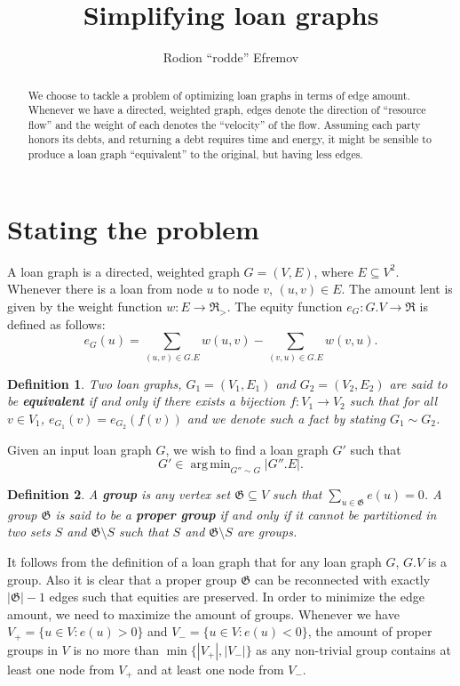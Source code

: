 \documentclass[10pt]{article}
\title{Simplifying loan graphs}
\author{Rodion ``rodde'' Efremov}
\newtheorem{mydef}{Definition}
\DeclareMathOperator*{\argmin}{arg\,min}
\begin{document}
\maketitle

\begin{abstract}
We choose to tackle a problem of optimizing loan graphs in terms of edge amount. Whenever we have a directed, weighted graph, edges denote the direction of ``resource flow'' and the weight of each denotes the ``velocity'' of the flow. Assuming each party honors its debts, and returning a debt requires time and energy, it might be sensible to produce a loan graph ``equivalent'' to the original, but having less edges.
\end{abstract}

\section{Stating the problem} A loan graph is a directed, weighted graph $G = (V, E)$, where $E \subseteq V^2$. Whenever there is a loan from node $u$ to node $v$, $(u, v) \in E$. The amount lent is given by the weight function $w \colon E \to \mathfrak{R}_{>}$. The equity function $e_G \colon G.V \to \mathfrak{R}$ is defined as follows:
\[
e_G(u) = \sum_{(u, v) \in G.E} w(u, v) - \sum_{(v, u) \in G.E} w(v, u).
\]
\begin{mydef}
Two loan graphs, $G_1 = (V_1, E_1)$ and $G_2 = (V_2, E_2)$ are said to be \textbf{equivalent} if and only if there exists a bijection $f \colon V_1 \to V_2$ such that for all $v \in V_1$, $e_{G_1}(v) = e_{G_2}(f(v))$ and we denote such a fact by stating $G_1 \sim G_2$.
\end{mydef}
\noindent Given an input loan graph $G$, we wish to find a loan graph $G'$ such that 
\[
G' \in \argmin_{G'' \sim G} |G''.E|.
\]
\begin{mydef}
A \textbf{group} is any vertex set $\mathfrak{G} \subseteq V$ such that $\sum_{u \in \mathfrak{G}} e(u) = 0$. A group $\mathfrak{G}$ is said to be a \textbf{proper group} if and only if it cannot be partitioned in two sets $S$ and $\mathfrak{G} \setminus S$ such that $S$ and $\mathfrak{G} \setminus S$ are groups.
\end{mydef}
\noindent It follows from the definition of a loan graph that for any loan graph $G$, $G.V$ is a group. Also it is clear that a proper group $\mathfrak{G}$ can be reconnected with exactly $|\mathfrak{G}| - 1$ edges such that equities are preserved. In order to minimize the edge amount, we need to maximize the amount of groups. Whenever we have $V_+ = \{u \in V \colon e(u) > 0\}$ and $V_- = \{u \in V \colon e(u) < 0\}$, the amount of proper groups in $V$ is no more than $\min \{ |V_+|, |V_-|\}$ as any non-trivial group contains at least one node from $V_+$ and at least one node from $V_-$.
\end{document}
